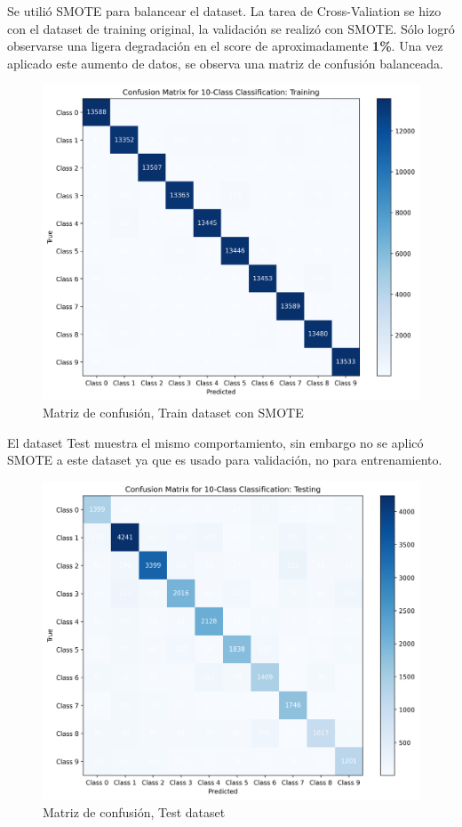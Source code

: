 \documentclass[journal]{IEEEtran}
\begin{document}
Se utilió SMOTE\cite{smote2023} para balancear el dataset. La tarea de Cross-Valiation se hizo con el dataset de training original, la validación se realizó con SMOTE. Sólo logró observarse una ligera degradación en el score de aproximadamente \textbf{1\%}. Una vez aplicado este aumento de datos, se observa una matriz de confusión balanceada.

\begin{figure}[H]
        \centering
        \includegraphics[width=\linewidth]{figures/confusion_matrix_Training_wSMOTE.png}
        \caption{Matriz de confusión, Train dataset con SMOTE}
        \label{fig:confusion_matrix_post_smote}
\end{figure}

El dataset Test muestra el mismo comportamiento, sin embargo no se aplicó SMOTE a este dataset ya que es usado para validación, no para entrenamiento.

\begin{figure}[H]
        \centering
        \includegraphics[width=\linewidth]{figures/confusion_matrix_Testing_wSMOTE.png}
        \caption{Matriz de confusión, Test dataset}
        \label{fig:confusion_matrix_test}
\end{figure}
\end{document}
